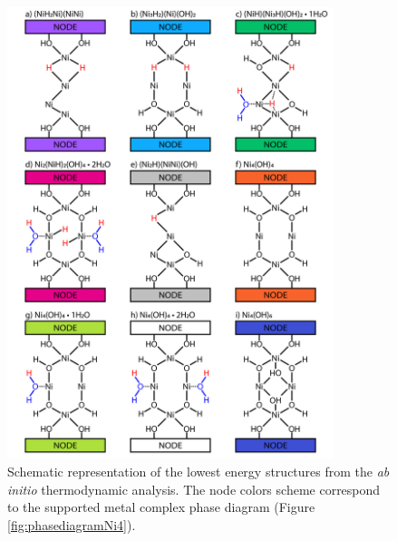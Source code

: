 \documentclass[journal=jctcce,manuscript=article]{achemso}
\begin{document}

\begin{figure}[H]
    \centering
    \includegraphics[width=0.85\textwidth]{zi-images/01-Ni-Graphics/2020-08-31-StructureDiagram-V01.png}
    \caption{Schematic representation of the lowest energy structures from the \textit{ab initio} thermodynamic analysis. The node colors scheme correspond to the  supported metal complex phase diagram (Figure \ref{fig:phasediagramNi4}).}
    \label{fig:structurediagramNi4}
\end{figure}
\end{document}
